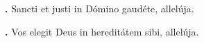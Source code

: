 \textbf{\Vbar.} Sancti et justi in Dómino gaudéte, allelúja.

\textbf{\Rbar.} Vos elegit Deus in hereditátem sibi, allelúja.
